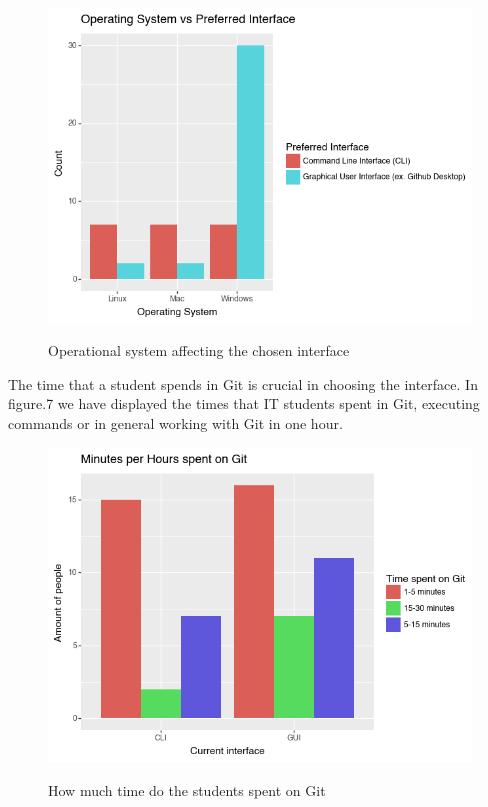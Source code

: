 \documentclass[]{report}
\begin{document}
		\begin{figure}[H]
			\centering
			\includegraphics[width=0.75\linewidth]{OSAffectsInterface}\\
			\caption{Operational system affecting the chosen interface}
			\label{fig: 6}
		\end{figure}
		
		The time that a student spends in Git is crucial in choosing the interface. In figure.7 we have displayed the times that IT students spent in Git, executing commands or in general working with Git in one hour.
			\begin{figure}[H]
			\centering
			\includegraphics[width=0.75\linewidth]{TimeSpentGit}\\
			\caption{How much time do the students spent on Git}
			\label{fig: 7}
		\end{figure}
		
\end{document}

